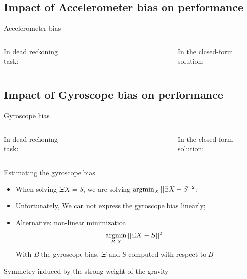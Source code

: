 \documentclass{beamer}
\newcommand{\argmin}{\operatornamewithlimits{argmin}}
\begin{document}
\subsection{Impact of Accelerometer bias on performance}
\begin{frame}{Accelerometer bias}
  \begin{columns}
    In dead reckoning task:
    \begin{figure}[h!]
      \centering
      \resizebox{\textwidth}{!}{}
    \end{figure}
    \begin{figure}[h!]
      \centering
      \resizebox{\textwidth}{!}{}
    \end{figure}
    In the closed-form solution:

  \end{columns}
\end{frame}

\subsection{Impact of Gyroscope bias on performance}
\begin{frame}{Gyroscope bias}
  \begin{columns}
    In dead reckoning task:


    \begin{figure}[h!]
      \centering
      \resizebox{0.7\textwidth}{!}{}
    \end{figure}
    \begin{figure}[h!]
      \centering
      \resizebox{0.7\textwidth}{!}{}
    \end{figure}
    In the closed-form solution:

  \end{columns}
\end{frame}

\begin{frame}{Estimating the gyroscope bias}

  \begin{itemize}[<+->]
  \item When solving  $\Xi X = S$, we are solving $\argmin_X ||\Xi X - S||^2$;
  \item Unfortunately, We can not express the gyroscope bias linearly;
  \item Alternative: non-linear minimization
  \[
  \argmin_{B,X} ||\Xi X - S||^2
  \]
  With $B$ the gyroscope bias, $\Xi$ and $S$ computed with respect to $B$
  \end{itemize}

  \begin{figure}[h!]
        \centering
        \resizebox{0.47\textwidth}{!}{}
  \end{figure}

  Symmetry induced by the strong weight of the gravity
\end{frame}
\end{document}
